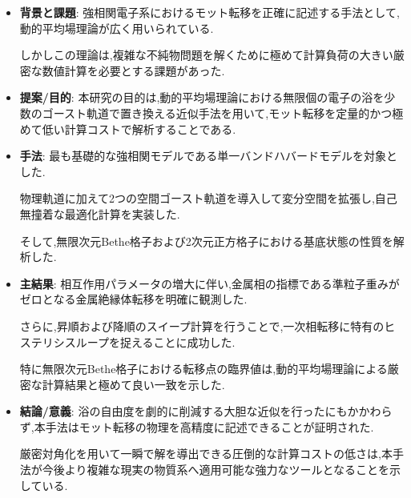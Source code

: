 \begin{itemize}
    \item \textbf{背景と課題}:
    強相関電子系におけるモット転移を正確に記述する手法として,動的平均場理論が広く用いられている.

    しかしこの理論は,複雑な不純物問題を解くために極めて計算負荷の大きい厳密な数値計算を必要とする課題があった.

    \item \textbf{提案/目的}:
    本研究の目的は,動的平均場理論における無限個の電子の浴を少数のゴースト軌道で置き換える近似手法を用いて,モット転移を定量的かつ極めて低い計算コストで解析することである.

    \item \textbf{手法}:
    最も基礎的な強相関モデルである単一バンドハバードモデルを対象とした.

    物理軌道に加えて2つの空間ゴースト軌道を導入して変分空間を拡張し,自己無撞着な最適化計算を実装した.

    そして,無限次元Bethe格子および2次元正方格子における基底状態の性質を解析した.

    \item \textbf{主結果}:
    相互作用パラメータの増大に伴い,金属相の指標である準粒子重みがゼロとなる金属絶縁体転移を明確に観測した.

    さらに,昇順および降順のスイープ計算を行うことで,一次相転移に特有のヒステリシスループを捉えることに成功した.

    特に無限次元Bethe格子における転移点の臨界値は,動的平均場理論による厳密な計算結果と極めて良い一致を示した.

    \item \textbf{結論/意義}:
    浴の自由度を劇的に削減する大胆な近似を行ったにもかかわらず,本手法はモット転移の物理を高精度に記述できることが証明された.

    厳密対角化を用いて一瞬で解を導出できる圧倒的な計算コストの低さは,本手法が今後より複雑な現実の物質系へ適用可能な強力なツールとなることを示している.
\end{itemize}